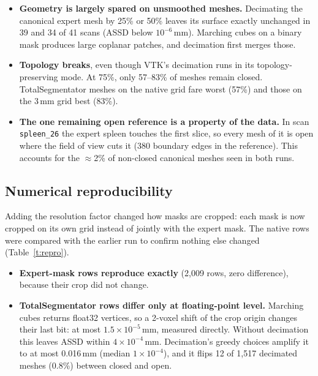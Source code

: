 \documentclass[10pt,a4paper]{article}
\begin{document}
\begin{itemize}
\item \textbf{Geometry is largely spared on unsmoothed meshes.} Decimating the canonical expert mesh by 25\% or 50\% leaves its surface exactly unchanged in 39 and 34 of 41 scans (ASSD below $10^{-6}$\,mm). Marching cubes on a binary mask produces large coplanar patches, and decimation first merges those.
\item \textbf{Topology breaks}, even though VTK's decimation runs in its topology-preserving mode. At 75\%, only 57--83\% of meshes remain closed. TotalSegmentator meshes on the native grid fare worst (57\%) and those on the 3\,mm grid best (83\%).
\item \textbf{The one remaining open reference is a property of the data.} In scan \texttt{spleen\_26} the expert spleen touches the first slice, so every mesh of it is open where the field of view cuts it (380 boundary edges in the reference). This accounts for the $\approx$2\% of non-closed canonical meshes seen in both runs.
\end{itemize}

\subsection{Numerical reproducibility}
\begin{table}[H]
\centering\small

\caption{Native-resolution rows of this run against the earlier native-only run (same seed). $|\Delta|$: absolute difference in ASSD.}
\label{t:repro}
\end{table}
Adding the resolution factor changed how masks are cropped: each mask is now cropped on its own grid instead of jointly with the expert mask. The native rows were compared with the earlier run to confirm nothing else changed (Table~\ref{t:repro}).

\begin{itemize}
\item \textbf{Expert-mask rows reproduce exactly} (2{,}009 rows, zero difference), because their crop did not change.
\item \textbf{TotalSegmentator rows differ only at floating-point level.} Marching cubes returns float32 vertices, so a 2-voxel shift of the crop origin changes their last bit: at most $1.5\times10^{-5}$\,mm, measured directly. Without decimation this leaves ASSD within $4\times10^{-4}$\,mm. Decimation's greedy choices amplify it to at most 0.016\,mm (median $1\times10^{-4}$), and it flips 12 of 1{,}517 decimated meshes (0.8\%) between closed and open.
\end{itemize}
\end{document}
